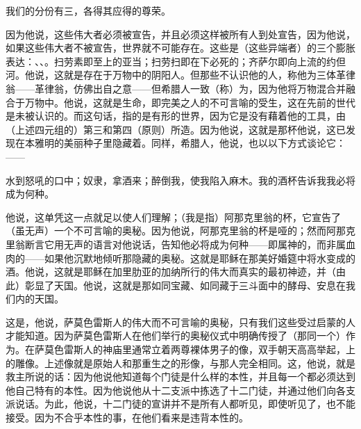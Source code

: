 我们的分份有三，各得\newline{}其应得的尊荣。\par

因为他说，这些伟大者必须被宣告，并且必须这样被所有人到处宣告，因为他说，如果这些伟大者不被宣告，世界就不可能存在。这些是（这些异端者）的三个膨胀表达：、、。扫劳素即至上的亚当；扫劳扫即在下必死的；齐萨尔即向上流的约但河。他说，这就是存在于万物中的阴阳人。但那些不认识他的人，称他为三体革律翁——革律翁，仿佛出自之意——但希腊人一致（称）为，因为他将万物混合并融合于万物中。他说，这就是生命，即完美之人的不可言喻的受生，这在先前的世代是未被认识的。而这句话，指的是有形的世界，因为它是没有藉着他的工具，由（上述四元组的）第三和第四（原则）所造。因为他说，这就是那杯他说，这已发现在本雅明的美丽种子里隐藏着。同样，希腊人，他说，也以以下方式谈论它：——\par

水到怒吼的口中；奴隶，拿酒来；\newline{}醉倒我，使我陷入麻木。\newline{}我的酒杯告诉我\newline{}我必将成为何种。\par

他说，这单凭这一点就足以使人们理解；（我是指）阿那克里翁的杯，它宣告了（虽无声）一个不可言喻的奥秘。因为他说，阿那克里翁的杯是哑的；然而阿那克里翁断言它用无声的语言对他说话，告知他必将成为何种——即属神的，而非属血肉的——如果他沉默地倾听那隐藏的奥秘。这就是耶稣在那美好婚筵中将水变成的酒。他说，这就是耶稣在加里肋亚的加纳所行的伟大而真实的最初神迹，并（由此）彰显了天国。他说，这就是那如同宝藏、如同藏于三斗面中的酵母、安息在我们内的天国。\par

这是，他说，萨莫色雷斯人的伟大而不可言喻的奥秘，只有我们这些受过启蒙的人才能知道。因为萨莫色雷斯人在他们举行的奥秘仪式中明确传授了（那同一个）作为。在萨莫色雷斯人的神庙里通常立着两尊裸体男子的像，双手朝天高高举起，上的雕像。上述像就是原始人和那重生之的形像，与那人完全相同。这，他说，就是救主所说的话：因为他说他知道每个门徒是什么样的本性，并且每一个都必须达到他自己特有的本性。因为他说他从十二支派中拣选了十二门徒，并通过他们向各支派说话。为此，他说，十二门徒的宣讲并不是所有人都听见，即使听见了，也不能接受。因为不合乎本性的事，在他们看来是违背本性的。\par

